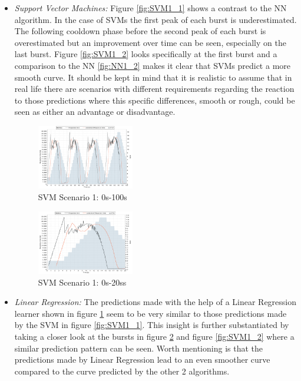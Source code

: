 \begin{itemize}
\item \textit{Support Vector Machines:} Figure \ref*{fig:SVM1_1} shows a contrast to the NN algorithm. In the case of SVMs the first peak of each burst is underestimated. The following cooldown phase before the second peak of each burst is overestimated but an improvement over time can be seen, especially on the last burst. Figure \ref{fig:SVM1_2} looks specifically at the first burst and a comparison to the NN \ref*{fig:NN1_2} makes it clear that SVMs predict a more smooth curve. It should be kept in mind that it is realistic to assume that in real life there are scenarios with different requirements regarding the reaction to those predictions where this specific differences, smooth or rough, could be seen as either an advantage or disadvantage.


\begin{figure}[ht]
	\begin{center}
		\includegraphics[width=0.40\textwidth]{chapters/chapter5/fig/LR1_1}
	\end{center}
	\caption{SVM Scenario 1: 0s-100s}
	\label{fig:LR1_1}
\end{figure}

\begin{figure}[ht]
	\begin{center}
		\includegraphics[width=0.40\textwidth]{chapters/chapter5/fig/LR1_2}
	\end{center}
	\caption{SVM Scenario 1: 0s-20ss}
	\label{fig:LR1_2}
\end{figure}

\item \textit{Linear Regression:} The predictions made with the help of a Linear Regression learner shown in figure \ref*{fig:LR1_1} seem to be very similar to those predictions made by the SVM in figure \ref*{fig:SVM1_1}. This insight is further substantiated by taking a closer look at the bursts in figure \ref*{fig:LR1_2} and figure \ref*{fig:SVM1_2} where a similar prediction pattern can be seen. Worth mentioning is that the predictions made by Linear Regression lead to an even smoother curve compared to the curve predicted by the other 2 algorithms.
\end{itemize}

